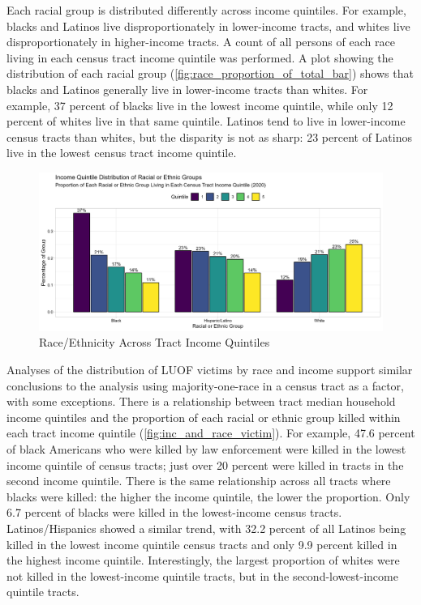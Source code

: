 \documentclass[12pt]{article}
\begin{document}
Each racial group is distributed differently across income quintiles. For example, blacks and Latinos live disproportionately in lower-income tracts, and whites live disproportionately in higher-income tracts. A count of all persons of each race living in each census tract income quintile was performed. A plot showing the distribution of each racial group (\autoref{fig:race_proportion_of_total_bar}) shows that blacks and Latinos generally live in lower-income tracts than whites. For example, 37 percent of blacks live in the lowest income quintile, while only 12 percent of whites live in that same quintile. Latinos tend to live in lower-income census tracts than whites, but the disparity is not as sharp: 23 percent of Latinos live in the lowest census tract income quintile.

\begin{figure}[H]
  \centering
  \includegraphics[width=\linewidth]{images/total_pop_quintiles_race}
  \captionsetup{justification=centering, singlelinecheck=false, margin=2cm}
  \caption{Race/Ethnicity Across Tract Income Quintiles}
  \label{fig:total_pop_quintiles_race}
\end{figure}

Analyses of the distribution of LUOF victims by race and income support similar conclusions to the analysis using majority-one-race in a census tract as a factor, with some exceptions. There is a relationship between tract median household income quintiles and the proportion of each racial or ethnic group killed within each tract income quintile (\autoref{fig:inc_and_race_victim}). For example, 47.6 percent of black Americans who were killed by law enforcement were killed in the lowest income quintile of census tracts; just over 20 percent were killed in tracts in the second income quintile. There is the same relationship across all tracts where blacks were killed: the higher the income quintile, the lower the proportion. Only 6.7 percent of blacks were killed in the lowest-income census tracts. Latinos/Hispanics showed a similar trend, with 32.2 percent of all Latinos being killed in the lowest income quintile census tracts and only 9.9 percent killed in the highest income quintile. Interestingly, the largest proportion of whites were not killed in the lowest-income quintile tracts, but in the second-lowest-income quintile tracts.
\end{document}
